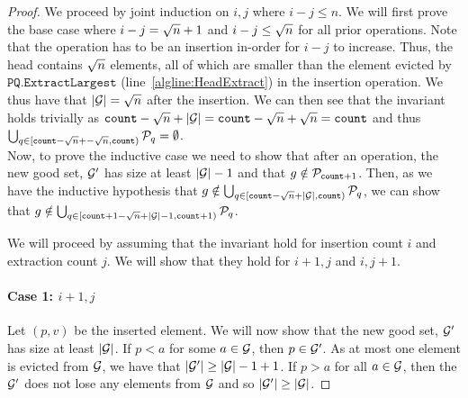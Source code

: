 \begin{proof}
We proceed by joint induction on $i, j$ where $i - j \leq n$. 
We will first prove the base case where $i - j = {\sqrt{n}} + 1$ and $i - j \leq {\sqrt{n}}$
for all prior operations.
Note that the operation has to be an insertion in-order for $i - j$ to increase. Thus, the head contains ${\sqrt{n}}$ elements, all of which are smaller than the element evicted by $\texttt{PQ.ExtractLargest}$ (line~\ref{algline:HeadExtract}) in the insertion operation.
We thus have that $|\mathcal{G}| = {\sqrt{n}}$ after the insertion. 
We can then see that the invariant holds trivially as ${\texttt{count}} - {\sqrt{n}} + |\mathcal{G}| = {\texttt{count}} - {\sqrt{n}} + {\sqrt{n}} = {\texttt{count}}$ and thus
$\bigcup_{q \in [{\texttt{count}} - {\sqrt{n}} + -{\sqrt{n}}, {\texttt{count}})} \mathcal{P}_q = \emptyset$.\\

Now, to prove the inductive case we need to show that after an operation, the new good set, $\mathcal{G}'$ has size
at least $|\mathcal{G}| - 1$ and that $g \notin \mathcal{P}_{{\texttt{count}} + 1}$. Then, as we have the inductive hypothesis
that $g \notin \bigcup_{q \in [{\texttt{count}} - {\sqrt{n}} + |\mathcal{G}|, {\texttt{count}})} \mathcal{P}_q$, 
we can show that $g \notin \bigcup_{q \in [{\texttt{count}} + 1 - {\sqrt{n}} + |\mathcal{G}| - 1, {\texttt{count}} + 1)} \mathcal{P}_q$.

We will proceed by assuming that the invariant hold for insertion count $i$ and extraction count $j$. We will show that they hold for $i + 1, j$ and $i, j + 1$.
\paragraph*{Case 1: $i + 1, j$}
\label{proof:case1}
Let $(p, v)$ be the inserted element. We will now show that the new good set, $\mathcal{G}'$
has size at least $|\mathcal{G}|$.
If $p < a$ for some $a \in \mathcal{G}$, then $p \in \mathcal{G}'$. As at most one element is evicted from $\mathcal{G}$,
we have that $|\mathcal{G}'| \geq |\mathcal{G}| - 1 + 1$. If $p > a$ for all $a \in \mathcal{G}$, then the $\mathcal{G}'$ does not lose any elements from $\mathcal{G}$ and so
$|\mathcal{G}'| \geq |\mathcal{G}|$.


\end{proof}
